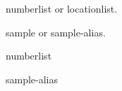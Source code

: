 \documentclass{article}
\begin{document}
\gls{numberlist} or \gls{locationlist}.

\gls{sample} or \gls{sample-alias}.

\newpage
\gls{numberlist}

\gls{sample-alias}
\newpage
\printglossaries
\end{document}
